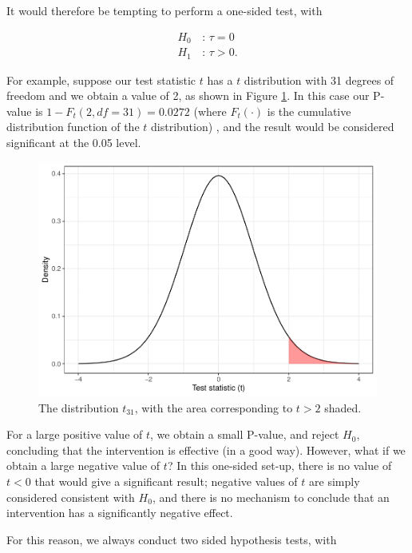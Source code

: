 \documentclass[
  openany]{book}
\theoremstyle{definition}
\theoremstyle{definition}
\theoremstyle{definition}
\theoremstyle{definition}
\theoremstyle{remark}
\begin{document}
It would therefore be tempting to perform a one-sided test, with

\begin{align*}
  H_0\,&:\, \tau=0\\
  H_1\,&:\, \tau>0.
\end{align*}

For example, suppose our test statistic \(t\) has a \(t\) distribution with 31 degrees of freedom and we obtain a value of 2, as shown in Figure \ref{fig:t31-onesided}.
In this case our P-value is \(1 - F_t\left(2, df=31\right)= 0.0272\) (where \(F_t\left(\cdot\right)\) is the cumulative distribution function of the \(t\) distribution) , and the result would be considered significant at the 0.05 level.

\begin{figure}
\centering
\includegraphics{CT4H_notes_files/figure-latex/t31-onesided-1.pdf}
\caption{\label{fig:t31-onesided}The distribution \(t_{31}\), with the area corresponding to \(t > 2\) shaded.}
\end{figure}

For a large positive value of \(t\), we obtain a small P-value, and reject \(H_0\), concluding that the intervention is effective (in a good way). However, what if we obtain a large negative value of \(t\)? In this one-sided set-up, there is no value of \(t<0\) that would give a significant result; negative values of \(t\) are simply considered consistent with \(H_0\), and there is no mechanism to conclude that an intervention has a significantly negative effect.

For this reason, we always conduct two sided hypothesis tests, with
\end{document}
